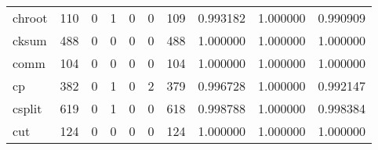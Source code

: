 \begin{tabular}{lrrrrrrrrr}
chroot    &                                   110 &                                                  0 &                                                  1 &                                                  0 &                                                  0 &                                                109 &                                           0.993182 &                               1.000000 &                             0.990909 \\
cksum     &                                   488 &                                                  0 &                                                  0 &                                                  0 &                                                  0 &                                                488 &                                           1.000000 &                               1.000000 &                             1.000000 \\
comm      &                                   104 &                                                  0 &                                                  0 &                                                  0 &                                                  0 &                                                104 &                                           1.000000 &                               1.000000 &                             1.000000 \\
cp        &                                   382 &                                                  0 &                                                  1 &                                                  0 &                                                  2 &                                                379 &                                           0.996728 &                               1.000000 &                             0.992147 \\
csplit    &                                   619 &                                                  0 &                                                  1 &                                                  0 &                                                  0 &                                                618 &                                           0.998788 &                               1.000000 &                             0.998384 \\
cut       &                                   124 &                                                  0 &                                                  0 &                                                  0 &                                                  0 &                                                124 &                                           1.000000 &                               1.000000 &                             1.000000 \\

\end{tabular}

